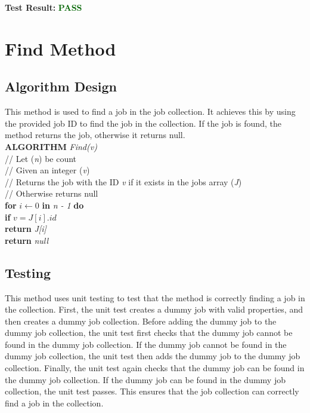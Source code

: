 \documentclass[12pt,a4paper]{article}
\begin{document}
			\textbf{Test Result:} \textbf{\textcolor{darkgreen}{PASS}}\\

	\newpage

	\section{Find Method}
		\subsection{Algorithm Design}
			This method is used to find a job in the job collection. It achieves this by using the provided 
			job ID to find the job in the collection. If the job is found, the method returns the job, 
			otherwise it returns null.\\

			\textbf{ALGORITHM} \textit{Find(v)}\\
			\null\hspace{1cm}// Let (\textit{n}) be count\\
			\null\hspace{1cm}// Given an integer (\textit{v})\\
			\null\hspace{1cm}// Returns the job with the ID \textit{v} if it exists in the jobs array (\textit{J})\\
			\null\hspace{1cm}// Otherwise returns null\\
			\null\hspace{1cm}\textbf{for} \textit{$i \gets 0$} \textbf{in} \textit{n - 1} \textbf{do}\\
			\null\hspace{2cm}\textbf{if} \textit{$v = J[i].id$}\\
			\null\hspace{3cm}\textbf{return} \textit{J[i]}\\
			\null\hspace{1cm}\textbf{return} \textit{null}\\

		\subsection{Testing}
			This method uses unit testing to test that the method is correctly finding a job in the 
			collection. First, the unit test creates a dummy job with valid properties, and then creates 
			a dummy job collection. Before adding the dummy job to the dummy job collection, the unit test 
			first checks that the dummy job cannot be found in the dummy job collection. If the dummy job 
			cannot be found in the dummy job collection, the unit test then adds the dummy job to the dummy 
			job collection. Finally, the unit test again checks that the dummy job can be found in the dummy 
			job collection. If the dummy job can be found in the dummy job collection, the unit test passes. 
			This ensures that the job collection can correctly find a job in the collection.\\
\end{document}
